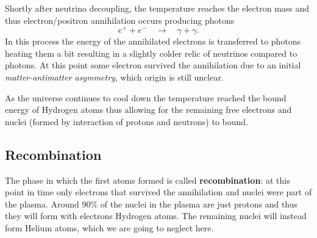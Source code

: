 Shortly after neutrino decoupling, the temperature reaches the electron mass and thus electron/positron annihilation occurs producing photons
$$e^++e^-\quad\longrightarrow\quad \gamma+\gamma.$$ In this process the energy of the annihilated electrons is transferred to photons heating them a bit resulting in a slightly colder relic of neutrinos compared to photons. At this point some electron survived the annihilation due to an initial \emph{matter-antimatter asymmetry}, which origin is still unclear.

As the universe continues to cool down the temperature reached the bound energy of Hydrogen atoms thus allowing for the remaining free electrons and nuclei (formed by interaction of protons and neutrons) to bound. 
\subsection{Recombination}
The phase in which the first atoms formed is called \textbf{recombination}: at this point in time only electrons that survived the annihilation and nuclei were part of the plasma. Around $90\%$ of the nuclei in the plasma are just protons and thus they will form with electrons Hydrogen atoms. The remaining nuclei will instead form Helium atoms, which we are going to neglect here. 

